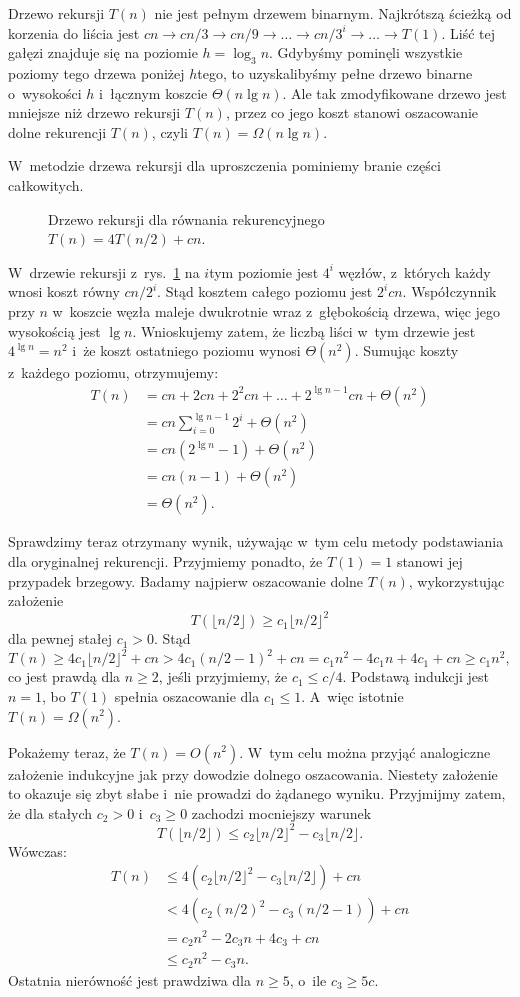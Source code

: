 \exercise %
Drzewo rekursji $T(n)$ nie jest pełnym drzewem binarnym.
Najkrótszą ścieżką od korzenia do liścia jest $cn\to cn/3\to cn/9\to\dots\to cn/3^i\to\dots\to T(1)$.
Liść tej gałęzi znajduje się na poziomie $h=\log_3n$.
Gdybyśmy pominęli wszystkie poziomy tego drzewa poniżej $h$\nbhyphen tego, to uzyskalibyśmy pełne drzewo binarne o~wysokości $h$ i~łącznym koszcie $\Theta(n\lg n)$.
Ale tak zmodyfikowane drzewo jest mniejsze niż drzewo rekursji $T(n)$, przez co jego koszt stanowi oszacowanie dolne rekurencji $T(n)$, czyli $T(n)=\Omega(n\lg n)$.

\exercise %
W~metodzie drzewa rekursji dla uproszczenia pominiemy branie części całkowitych.
\begin{figure}[!ht]
	\centering 
	\caption{Drzewo rekursji dla równania rekurencyjnego $T(n)=4T(n/2)+cn$.} \label{fig:4.2-3}
\end{figure}
W~drzewie rekursji z~rys.\ \ref{fig:4.2-3} na $i$\nbhyphen tym poziomie jest $4^i$ węzłów, z~których każdy wnosi koszt równy $cn/2^i$.
Stąd kosztem całego poziomu jest $2^icn$.
Współczynnik przy $n$ w~koszcie węzła maleje dwukrotnie wraz z~głębokością drzewa, więc jego wysokością jest $\lg n$.
Wnioskujemy zatem, że liczbą liści w~tym drzewie jest $4^{\lg n}=n^2$ i~że koszt ostatniego poziomu wynosi $\Theta(n^2)$.
Sumując koszty z~każdego poziomu, otrzymujemy:
\begin{align*}
	T(n) &= cn+2cn+2^2cn+\dots+2^{\lg n-1}cn+\Theta(n^2) \\
	&= cn\sum_{i=0}^{\lg n-1}2^i+\Theta(n^2) \\
	&= cn(2^{\lg n}-1)+\Theta(n^2) \\
	&= cn(n-1)+\Theta(n^2) \\
	&= \Theta(n^2).
\end{align*}

Sprawdzimy teraz otrzymany wynik, używając w~tym celu metody podstawiania dla oryginalnej rekurencji.
Przyjmiemy ponadto, że $T(1)=1$ stanowi jej przypadek brzegowy.
Badamy najpierw oszacowanie dolne $T(n)$, wykorzystując założenie
\[
	T(\lfloor n/2\rfloor) \ge c_1\lfloor n/2\rfloor^2
\]
dla pewnej stałej $c_1>0$.
Stąd
\[
	T(n) \ge 4c_1\lfloor n/2\rfloor^2+cn > 4c_1(n/2-1)^2+cn = c_1n^2-4c_1n+4c_1+cn \ge c_1n^2,
\]
co jest prawdą dla $n\ge2$, jeśli przyjmiemy, że $c_1\le c/4$.
Podstawą indukcji jest $n=1$, bo $T(1)$ spełnia oszacowanie dla $c_1\le1$.
A~więc istotnie $T(n)=\Omega(n^2)$.

Pokażemy teraz, że $T(n)=O(n^2)$.
W~tym celu można przyjąć analogiczne założenie indukcyjne jak przy dowodzie dolnego oszacowania.
Niestety założenie to okazuje się zbyt słabe i~nie prowadzi do żądanego wyniku.
Przyjmijmy zatem, że dla stałych $c_2>0$ i~$c_3\ge0$ zachodzi mocniejszy warunek
\[
	T(\lfloor n/2\rfloor) \le c_2\lfloor n/2\rfloor^2-c_3\lfloor n/2\rfloor.
\]
Wówczas:
\begin{align*}
	T(n) &\le 4(c_2\lfloor n/2\rfloor^2-c_3\lfloor n/2\rfloor)+cn \\
	&< 4(c_2(n/2)^2-c_3(n/2-1))+cn \\
	&= c_2n^2-2c_3n+4c_3+cn \\
	&\le c_2n^2-c_3n.
\end{align*}
Ostatnia nierówność jest prawdziwa dla $n\ge5$, o~ile $c_3\ge5c$.

